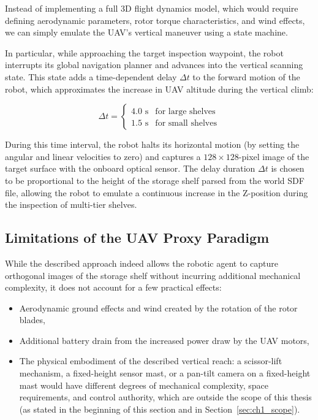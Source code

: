 Instead of implementing a full 3D flight dynamics model, which would require defining aerodynamic parameters, rotor torque characteristics, and wind effects, we can simply emulate the UAV's vertical maneuver using a state machine.

In particular, while approaching the target inspection waypoint, the robot interrupts its global navigation planner and advances into the vertical scanning state. This state adds a time-dependent delay $\Delta t$ to the forward motion of the robot, which approximates the increase in UAV altitude during the vertical climb:

\begin{equation}
\Delta t = \begin{cases} 4.0\text{ s} & \text{for large shelves} \\ 1.5\text{ s} & \text{for small shelves} \end{cases}
\end{equation}

During this time interval, the robot halts its horizontal motion (by setting the angular and linear velocities to zero) and captures a $128 \times 128$-pixel image of the target surface with the onboard optical sensor. The delay duration $\Delta t$ is chosen to be proportional to the height of the storage shelf parsed from the world SDF file, allowing the robot to emulate a continuous increase in the Z-position during the inspection of multi-tier shelves.

\subsection{Limitations of the UAV Proxy Paradigm}

While the described approach indeed allows the robotic agent to capture orthogonal images of the storage shelf without incurring additional mechanical complexity, it does not account for a few practical effects:

\begin{itemize}
    \item Aerodynamic ground effects and wind created by the rotation of the rotor blades,
    \item Additional battery drain from the increased power draw by the UAV motors,
    \item The physical embodiment of the described vertical reach: a scissor-lift mechanism, a fixed-height sensor mast, or a pan-tilt camera on a fixed-height mast would have different degrees of mechanical complexity, space requirements, and control authority, which are outside the scope of this thesis (as stated in the beginning of this section and in Section~\ref{sec:ch1_scope}).
\end{itemize}

